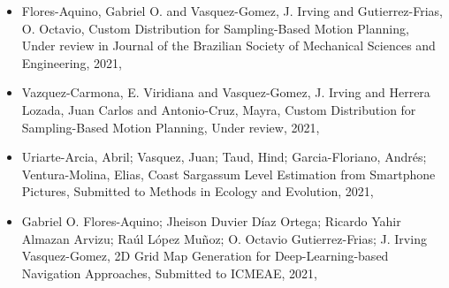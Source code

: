 \begin{itemize} 
\item Flores-Aquino, Gabriel O. and Vasquez-Gomez, J. Irving and Gutierrez-Frias, O. Octavio, Custom Distribution for Sampling-Based Motion Planning, Under review in Journal of the Brazilian Society of Mechanical Sciences and Engineering, 2021, \href{https://arxiv.org/abs/2104.10292}{\faFilePdfO} 
\item Vazquez-Carmona, E. Viridiana and Vasquez-Gomez, J. Irving and Herrera Lozada, Juan Carlos and Antonio-Cruz, Mayra, Custom Distribution for Sampling-Based Motion Planning, Under review, 2021, \href{https://arxiv.org/abs/2105.08743}{\faFilePdfO} 
\item Uriarte-Arcia, Abril; Vasquez, Juan; Taud, Hind; Garcia-Floriano, Andrés; Ventura-Molina, Elias, Coast Sargassum Level Estimation from Smartphone Pictures, Submitted to Methods in Ecology and Evolution, 2021, \href{https://arxiv.org/abs/3939932}{\faFilePdfO} 
\item Gabriel O. Flores-Aquino; Jheison Duvier Díaz Ortega; Ricardo Yahir Almazan Arvizu; Raúl López Muñoz; O. Octavio Gutierrez-Frias; J. Irving Vasquez-Gomez, 2D Grid Map Generation for Deep-Learning-based Navigation Approaches, Submitted to ICMEAE, 2021, \href{https://arxiv.org/abs/2110.13242}{\faFilePdfO} 
\end{itemize} 

